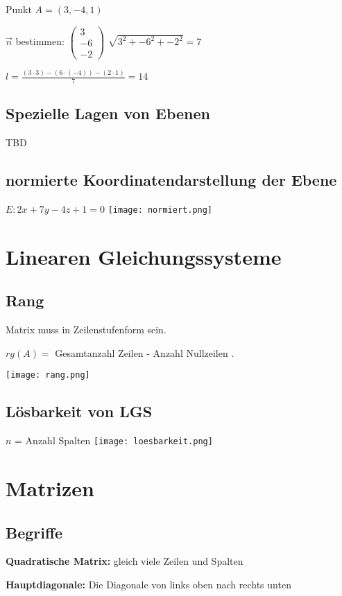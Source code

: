 \begin{multicols*}{3}
    {Punkt $A = (3,-4,1)$}


    { $\vec{n}$ bestimmen: $\begin{pmatrix}
                3  \\
                -6 \\
                -2
            \end{pmatrix}$ $\sqrt{3^2+-6^2+-2^2} = 7$}

    { $l = \frac{(3 \cdot 3) -(6 \cdot (-4)) - (2 \cdot 1)}{7} = 14$}
    \WhiteSpace
    \subsection{Spezielle Lagen von Ebenen}
    {TBD}

    \subsection{  normierte Koordinatendarstellung der Ebene}
    {$E: 2x + 7y - 4z + 1 = 0$}
    \texttt{[image: normiert.png]}


    \section{Linearen Gleichungssysteme}
    \WhiteSpace
    \subsection{Rang}
    {Matrix muss in Zeilenstufenform sein.}

    {$rg(A) = $ Gesamtanzahl Zeilen - Anzahl Nullzeilen .}

    \texttt{[image: rang.png]}

    \subsection{Lösbarkeit von LGS}
    {$ n $ = Anzahl Spalten}
    \texttt{[image: loesbarkeit.png]}

    \section{Matrizen}
    \subsection{Begriffe}
    {\textbf{Quadratische Matrix:} gleich viele Zeilen und Spalten}

    \textbf{Hauptdiagonale:} Die Diagonale von links oben nach rechts unten


\end{multicols*}
